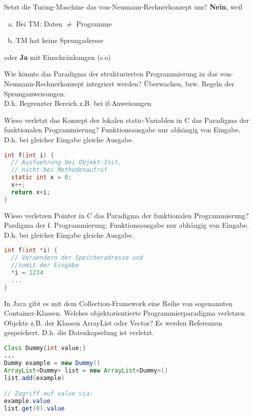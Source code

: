 \begin{card}
	Setzt die Turing-Maschine das von-Neumann-Rechnerkonzept um?
	\hr
	\textbf{Nein}, weil
	\begin{enumerate}[a)]
	\item Bei TM: Daten $\neq$ Programme
	\item TM hat keine Sprungadresse
	\end{enumerate}
	oder \textbf{Ja} mit Einschränkungen (s.o)
\end{card}

\begin{card}
	Wie könnte das Paradigma der strukturierten Programmierung in das von-Neumann-Rechnerkonzept integriert werden?
	\hr
	Überwachen, bzw. Regeln der Sprunganweisungen.\\
	D.h. Begrenzter Bereich z.B. bei if-Anweisungen
\end{card}

\begin{card}
	Wieso verletzt das Konzept der lokalen static-Variablen in C das Paradigma der funktionalen
	Programmierung?
	\hr
	Funktionsausgabe nur abhängig von Eingabe. D.h. bei gleicher Eingabe gleiche Ausgabe.
	\begin{lstlisting}[language=C]
int f(int i) {
  // Ausfuehrung bei Objekt-Init, 
  // nicht bei Methodenaufruf
  static int x = 0; 
  x++;
  return x+i;
}
	\end{lstlisting}	
\end{card}

\begin{card}
	Wieso verletzen Pointer in C das Paradigma der funktionalen Programmierung?
	\hr
	Pardigma der f. Programmierung: Funktionsausgabe nur abhängig von Eingabe.  D.h. bei gleicher Eingabe gleiche Ausgabe.
	\begin{lstlisting}[language=C]
int f(int *i) {
  // Veraendern der Speicheradresse und 
  //somit der Eingabe
  *i = 1234
  ...
}
	\end{lstlisting}	
\end{card}

\begin{card}
	In Java gibt es mit dem Collection-Framework eine Reihe von sogenannten Container-Klassen. Welches objektorientierte Programmierparadigma verletzen Objekte z.B. der Klassen	ArrayList oder Vector? 
	\hr
	Es werden Referenzen gespeichert. D.h. die Datenkapselung ist verletzt.
	\begin{lstlisting}[language=Java]
Class Dummy{int value;}
...
Dummy example = new Dummy()
ArrayList<Dummy> list = new ArrayList<Dummy>()
list.add(example)

// Zugriff auf value via:
example.value
list.get(0).value
	\end{lstlisting}	
\end{card}

